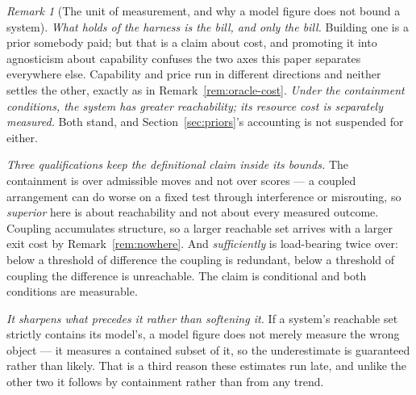 \documentclass[11pt,a4paper]{article}
\theoremstyle{remark}
\newtheorem{remark}[definition]{Remark}
\begin{document}
\begin{remark}[The unit of measurement, and why a model figure does not bound a system]
\emph{What holds of the harness is the bill, and only the bill.} Building one is a prior somebody paid;
but that is a claim about cost, and promoting it into agnosticism about capability confuses the two
axes this paper separates everywhere else. Capability and price run in different directions and neither
settles the other, exactly as in Remark~\ref{rem:oracle-cost}. \emph{Under the containment conditions, the system has greater reachability; its resource cost is separately measured.} Both stand, and Section~\ref{sec:priors}'s accounting is not
suspended for either.

\emph{Three qualifications keep the definitional claim inside its bounds.} The containment is over
admissible moves and not over scores --- a coupled arrangement can do worse on a fixed test through
interference or misrouting, so \emph{superior} here is about reachability and not about every measured
outcome. Coupling accumulates structure, so a larger reachable set arrives with a larger exit cost by
Remark~\ref{rem:nowhere}. And \emph{sufficiently} is load-bearing twice over: below a threshold of
difference the coupling is redundant, below a threshold of coupling the difference is unreachable. The
claim is conditional and both conditions are measurable.

\emph{It sharpens what precedes it rather than softening it.} If a system's reachable set strictly
contains its model's, a model figure does not merely measure the wrong object --- it measures a
contained subset of it, so the underestimate is guaranteed rather than likely. That is a third reason
these estimates run late, and unlike the other two it follows by containment rather than from any
trend.
\end{remark}
\end{document}
